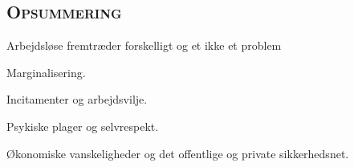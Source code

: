\subsection{\textsc{Opsummering}}

Arbejdsløse fremtræder forskelligt og et ikke et problem %

Marginalisering. %

Incitamenter og arbejdsvilje. %

Psykiske plager og selvrespekt. %

Økonomiske vanskeligheder og det offentlige og private sikkerhedsnet. %





